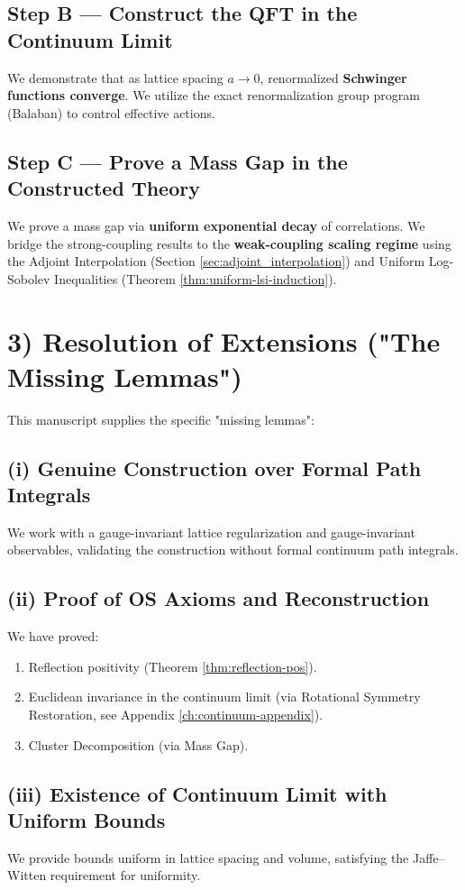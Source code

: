 \subsection{Step B --- Construct the QFT in the Continuum Limit}
We demonstrate that as lattice spacing $a \to 0$, renormalized \textbf{Schwinger functions converge}. We utilize the exact renormalization group program (Balaban) to control effective actions.

\subsection{Step C --- Prove a Mass Gap in the Constructed Theory}
We prove a mass gap via \textbf{uniform exponential decay} of correlations. We bridge the strong-coupling results to the \textbf{weak-coupling scaling regime} using the Adjoint Interpolation (Section \ref{sec:adjoint_interpolation}) and Uniform Log-Sobolev Inequalities (Theorem \ref{thm:uniform-lsi-induction}).

\section{3) Resolution of Extensions ("The Missing Lemmas")}

This manuscript supplies the specific "missing lemmas":

\subsection{(i) Genuine Construction over Formal Path Integrals}
We work with a gauge-invariant lattice regularization and gauge-invariant observables, validating the construction without formal continuum path integrals.

\subsection{(ii) Proof of OS Axioms and Reconstruction}
We have proved:
\begin{enumerate}
    \item Reflection positivity (Theorem \ref{thm:reflection-pos}).
    \item Euclidean invariance in the continuum limit (via Rotational Symmetry Restoration, see Appendix \ref{ch:continuum-appendix}).
    \item Cluster Decomposition (via Mass Gap).
\end{enumerate}

\subsection{(iii) Existence of Continuum Limit with Uniform Bounds}
We provide bounds uniform in lattice spacing and volume, satisfying the Jaffe--Witten requirement for uniformity.

